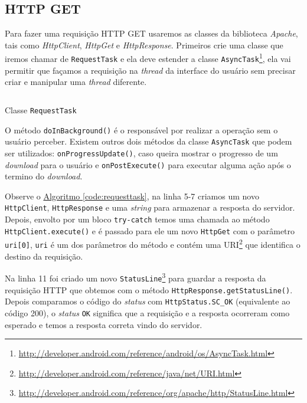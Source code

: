 \documentclass[a4paper,12pt,brazil,oneside]{book}
\begin{document}
\begin{singlespace}
		\subsection{HTTP GET}

		Para fazer uma requisição HTTP GET usaremos as classes da biblioteca \emph{Apache}, tais como \emph{HttpClient}, \emph{HttpGet} e \emph{HttpResponse}. Primeiros crie uma classe que iremos chamar de \texttt{RequestTask} e ela deve estender a classe \texttt{AsyncTask}\footnote{\href{http://developer.android.com/reference/android/os/AsyncTask.html}{http://developer.android.com/reference/android/os/AsyncTask.html}}, ela vai permitir que façamos a requisição na \emph{thread} da interface do usuário sem precisar criar e manipular uma \emph{thread} diferente.

		\begin{listing}[H]
		\inputminted[linenos=true,fontsize=\small,frame=lines, framesep=2mm, tabsize=2,numbersep=5pt]{java}{src/api/comm/asynctask.java}
		\caption{Classe \texttt{RequestTask}}
		\label{code:requesttask}
		\end{listing}

		O método \texttt{doInBackground()} é o responsável por realizar a operação sem o usuário perceber. Existem outros dois métodos da classe \texttt{AsyncTask} que podem ser utilizados: \texttt{onProgressUpdate()}, caso queira mostrar o progresso de um \emph{download} para o usuário e \texttt{onPostExecute()} para executar alguma ação após o termino do \emph{download}.

		Observe o \hyperref[code:requesttask]{Algoritmo \ref*{code:requesttask}}, na linha 5-7 criamos um novo \texttt{HttpClient}, \texttt{HttpResponse} e uma \emph{string} para armazenar a resposta do servidor. Depois, envolto por um bloco \texttt{try-catch} temos uma chamada ao método \texttt{HttpClient.execute()} e é passado para ele um novo \texttt{HttpGet} com o parâmetro \texttt{uri[0]}, \texttt{uri} é um dos parâmetros do método e contém uma URI\footnote{\href{http://developer.android.com/reference/java/net/URI.html}{http://developer.android.com/reference/java/net/URI.html}} que identifica o destino da requisição.

		Na linha 11 foi criado um novo \texttt{StatusLine}\footnote{\href{http://developer.android.com/reference/org/apache/http/StatusLine.html}{http://developer.android.com/reference/org/apache/http/StatusLine.html}} para guardar a resposta da requisição HTTP que obtemos com o método \texttt{HttpResponse.getStatusLine()}. Depois comparamos o código do \emph{status} com \texttt{HttpStatus.SC\_OK} (equivalente ao código 200), o \emph{status} \texttt{OK} significa que a requisição e a resposta ocorreram como esperado e temos a resposta correta vindo do servidor. 


\end{singlespace}
\end{document}
